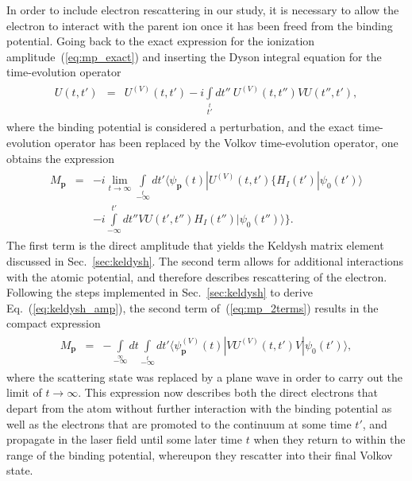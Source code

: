 In order to include electron rescattering in our study, it is
necessary to allow the electron to interact with the parent ion once
it has been freed from the binding potential. Going back to the exact
expression for the ionization amplitude~(\ref{eq:mp_exact}) and
inserting the Dyson integral equation for the time-evolution operator
\begin{eqnarray}
\label{eq:dysonV}
\begin{split}
U(t,t') & = & U^{(V)}(t,t') -
i\int\limits_{t'}\limits^{t} dt''\ U^{(V)}(t,t'') V U(t'',t'),
\end{split}
\end{eqnarray}
where the binding potential is considered a perturbation, and the
exact time-evolution operator has been replaced by the Volkov
time-evolution operator, one obtains the expression
\begin{eqnarray}
\label{eq:mp_2terms}
\begin{split}
M_{\mathbf{p}} & = & -i \lim\limits_{t\to\infty} \int\limits_{-\infty}\limits^{t}
dt' \langle \psi_{\mathbf{p}}(t) | U^{(V)}(t, t') \{ H_{I}(t') | \psi_{0}(t') \rangle \\
& &
-i \int\limits_{-\infty}^{t'} dt'' V U(t', t'') H_{I}(t'') | \psi_{0}(t'') \rangle \}.
\end{split}
\end{eqnarray}
The first term is the direct amplitude that yields the Keldysh matrix
element discussed in Sec.~\ref{sec:keldysh}. The second term allows
for additional interactions with the atomic potential, and therefore
describes rescattering of the electron. Following the steps
implemented in Sec.~\ref{sec:keldysh} to derive
Eq.~(\ref{eq:keldysh_amp}), the second term of~(\ref{eq:mp_2terms})
results in the compact expression~\cite{Kopold_1997sfa}
\begin{eqnarray}
\label{eq:mp_compact}
\begin{split}
M_{\mathbf{p}} & = & - \int\limits_{-\infty}\limits^{\infty} dt
\int\limits_{-\infty}\limits^{t} dt' \langle \psi_{\mathbf{p}}^{(V)}(t)
| V U^{(V)}(t, t') V | \psi_{0}(t') \rangle,
\end{split}
\end{eqnarray}
where the scattering state was replaced by a plane wave in order to
carry out the limit of $t\to\infty$. This expression now describes
both the direct electrons that depart from the atom without further
interaction with the binding potential as well as the electrons that
are promoted to the continuum at some time $t'$, and propagate in the
laser field until some later time $t$ when they return to within the
range of the binding potential, whereupon they rescatter into their
final Volkov state.

